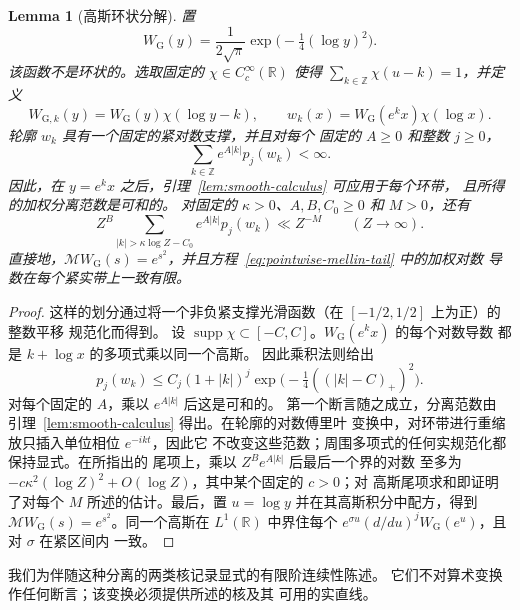 \documentclass[11pt,a4paper]{article}
\numberwithin{equation}{section}
\numberwithin{figure}{section}
\newtheorem{lemma}[theorem]{Lemma}
\theoremstyle{definition}
\theoremstyle{remark}
\begin{document}
\begin{lemma}[高斯环状分解]\label{lem:gaussian-annular}
置
\[
 W_{\mathrm G}(y)=\frac1{2\sqrt\pi}
                         \exp\bigl(-\tfrac14(\log y)^2\bigr).
\]
该函数不是环状的。选取固定的 $\chi\in C_c^\infty(\mathbb R)$
使得 $\sum_{k\in\mathbb Z}\chi(u-k)=1$，并定义
\[
 W_{{\mathrm G},k}(y)=W_{\mathrm G}(y)\chi(\log y-k),\qquad
 w_k(x)=W_{\mathrm G}(e^k x)\chi(\log x).
\]
轮廓 $w_k$ 具有一个固定的紧对数支撑，并且对每个
固定的 $A\ge0$ 和整数 $j\ge0$，
\begin{equation}\label{eq:gaussian-annular-sum}
 \sum_{k\in\mathbb Z}e^{A|k|}p_j(w_k)<\infty.
\end{equation}
因此，在 $y=e^k x$ 之后，引理~\ref{lem:smooth-calculus} 可应用于每个环带，
且所得的加权分离范数是可和的。
对固定的 $\kappa>0$、$A,B,C_0\ge0$ 和 $M>0$，还有
\[
 Z^B\sum_{|k|>\kappa\log Z-C_0}e^{A|k|}p_j(w_k)\ll Z^{-M}
       \qquad(Z\to\infty).
\]
直接地，$\mathcal MW_{\mathrm G}(s)=e^{s^2}$，并且方程~\eqref{eq:pointwise-mellin-tail} 中的加权对数
导数在每个紧实带上一致有限。
\end{lemma}

\begin{proof}
这样的划分通过将一个非负紧支撑光滑函数（在 $[-1/2,1/2]$ 上为正）的整数平移
规范化而得到。
设 $\operatorname{supp}\chi\subset[-C,C]$。$W_{\mathrm G}(e^k x)$ 的每个对数导数
都是 $k+\log x$ 的多项式乘以同一个高斯。
因此乘积法则给出
\[
 p_j(w_k)\le C_j(1+|k|)^j
             \exp\bigl(-\tfrac14((|k|-C)_+)^2\bigr).
\]
对每个固定的 $A$，乘以 $e^{A|k|}$ 后这是可和的。
第一个断言随之成立，分离范数由
引理~\ref{lem:smooth-calculus} 得出。在轮廓的对数傅里叶
变换中，对环带进行重缩放只插入单位相位 $e^{-ikt}$，因此它
不改变这些范数；周围多项式的任何实规范化都保持显式。在所指出的
尾项上，乘以 $Z^Be^{A|k|}$ 后最后一个界的对数
至多为 $-c\kappa^2(\log Z)^2+O(\log Z)$，其中某个固定的 $c>0$；对
高斯尾项求和即证明了对每个 $M$ 所述的估计。最后，置
$u=\log y$ 并在其高斯积分中配方，得到
$\mathcal MW_{\mathrm G}(s)=e^{s^2}$。同一个高斯在 $L^1(\mathbb R)$ 中界住每个
$e^{\sigma u}(d/du)^jW_{\mathrm G}(e^u)$，且对 $\sigma$ 在紧区间内
一致。
\end{proof}

我们为伴随这种分离的两类核记录显式的有限阶连续性陈述。
它们不对算术变换作任何断言；该变换必须提供所述的核及其
可用的实直线。
\end{document}
